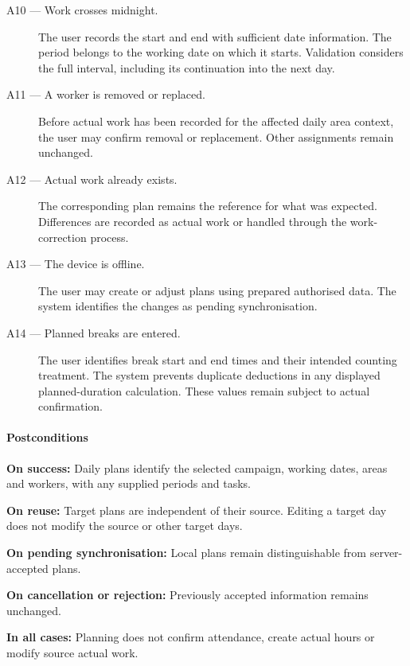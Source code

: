 \begin{description}
    \item[A10 --- Work crosses midnight.]
    The user records the start and end
    with sufficient date information.
    The period belongs to the working date
    on which it starts.
    Validation considers the full interval,
    including its continuation into the next day.

    \item[A11 --- A worker is removed or replaced.]
    Before actual work has been recorded
    for the affected daily area context,
    the user may confirm removal or replacement.
    Other assignments remain unchanged.

    \item[A12 --- Actual work already exists.]
    The corresponding plan remains
    the reference for what was expected.
    Differences are recorded as actual work
    or handled through the work-correction process.

    \item[A13 --- The device is offline.]
    The user may create or adjust plans
    using prepared authorised data.
    The system identifies the changes
    as pending synchronisation.

    \item[A14 --- Planned breaks are entered.]
    The user identifies break start and end times
    and their intended counting treatment.
    The system prevents duplicate deductions
    in any displayed planned-duration calculation.
    These values remain subject to actual confirmation.
\end{description}

\paragraph{Postconditions}

\textbf{On success:}
Daily plans identify the selected campaign,
working dates, areas and workers,
with any supplied periods and tasks.

\textbf{On reuse:}
Target plans are independent of their source.
Editing a target day does not modify
the source or other target days.

\textbf{On pending synchronisation:}
Local plans remain distinguishable
from server-accepted plans.

\textbf{On cancellation or rejection:}
Previously accepted information remains unchanged.

\textbf{In all cases:}
Planning does not confirm attendance,
create actual hours or modify source actual work.

